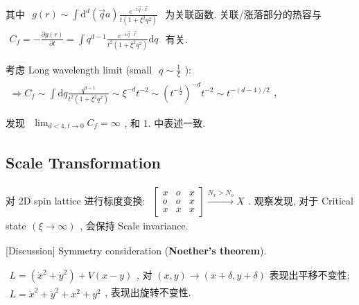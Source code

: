 \documentclass[../../main.tex]{subfiles}
\begin{document}
其中 $\begin{aligned} 
    g(r)\sim \int\mathrm{d}^{d}\left(\vec{q}a\right)\frac{e^{-i\vec{q}\cdot\vec{x}}}{t(1+\xi^{2}q^{2})} 
\end{aligned}$ 为关联函数. 关联/涨落部分的热容与 $\begin{aligned}
    C_{f} = -\frac{\partial g(r)}{\partial t} = \int q^{d-1}\frac{e^{-i\vec{q}\cdot\vec{r}}}{t^{2}(1+\xi^{2}q^{2})}\mathrm{d}q
\end{aligned}$ 有关. 

考虑 Long wavelength limit (small $\begin{aligned}
    q\sim \frac{1}{\xi}
\end{aligned}$): $\begin{aligned}
    \Rightarrow C_{f}\sim \int\mathrm{d}q\frac{q^{d-1}}{t^{2}(1+\xi^{2}q^{2})}\sim \xi^{-d}t^{-2}\sim \left(t^{-\frac{1}{2}}\right)^{-d}t^{-2}\sim t^{-(d-4)/2}
\end{aligned}$, 

发现 $\begin{aligned}
    \lim_{d<4,t\rightarrow 0}C_{f}=\infty
\end{aligned}$, 和 1. 中表述一致. 

\subsection{Scale Transformation}

对 2D spin lattice 进行标度变换: $\begin{aligned}
    \begin{bmatrix}
        x & o & x\\
        o & o & x\\
        x & x & x
    \end{bmatrix}\stackrel{N_{x}>N_{o}}{\longrightarrow} X
\end{aligned}$. 观察发现, 对于 Critical state$\begin{aligned}
    (\xi\rightarrow \infty)
\end{aligned}$, 会保持 Scale invariance. 

[Discussion] Symmetry consideration (\textbf{Noether's theorem}). 

$\begin{aligned}
    L = \left(\dot{x}^{2} + \dot{y}^{2}\right) + V(x-y)
\end{aligned}$, 对 $(x,y)\rightarrow (x+\delta,y+\delta)$ 表现出平移不变性; $\begin{aligned}
    L = \dot{x}^{2} + \dot{y}^{2} + x^{2} + y^{2}
\end{aligned}$, 表现出旋转不变性. 
\end{document}
